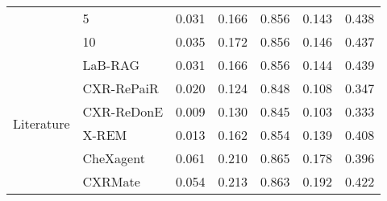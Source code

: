 \begin{tabular}{llrrrrr}
 & 5 & 0.031 & 0.166 & 0.856 & 0.143 & 0.438 \\
 & 10 & 0.035 & 0.172 & 0.856 & 0.146 & 0.437 \\
\cline{1-7}
\multirow[t]{6}{*}{Literature} & LaB-RAG & 0.031 & 0.166 & 0.856 & 0.144 & 0.439 \\
 & CXR-RePaiR & 0.020 & 0.124 & 0.848 & 0.108 & 0.347 \\
 & CXR-ReDonE & 0.009 & 0.130 & 0.845 & 0.103 & 0.333 \\
 & X-REM & 0.013 & 0.162 & 0.854 & 0.139 & 0.408 \\
 & CheXagent & 0.061 & 0.210 & 0.865 & 0.178 & 0.396 \\
 & CXRMate & 0.054 & 0.213 & 0.863 & 0.192 & 0.422 \\
\cline{1-7}
\bottomrule
\end{tabular}
